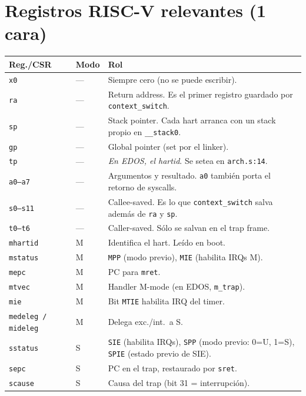 \documentclass[11pt,a4paper]{article}
\begin{document}
\section{Registros RISC-V relevantes (1 cara)}

\begin{center}
\footnotesize
\begin{tabular}{@{}llp{9.5cm}@{}}
\toprule
Reg./CSR & Modo & Rol \\
\midrule
\texttt{x0}             & --- & Siempre cero (no se puede escribir). \\
\texttt{ra}             & --- & Return address. Es el primer registro guardado por \texttt{context\_switch}. \\
\texttt{sp}             & --- & Stack pointer. Cada hart arranca con un stack propio en \texttt{\_\_stack0}. \\
\texttt{gp}             & --- & Global pointer (set por el linker). \\
\texttt{tp}             & --- & \emph{En EDOS, el hartid}. Se setea en \texttt{arch.s:14}. \\
\texttt{a0--a7}         & --- & Argumentos y resultado. \texttt{a0} también porta el retorno de syscalls. \\
\texttt{s0--s11}        & --- & Callee-saved. Es lo que \texttt{context\_switch} salva además de \texttt{ra} y \texttt{sp}. \\
\texttt{t0--t6}         & --- & Caller-saved. Sólo se salvan en el trap frame. \\
\midrule
\texttt{mhartid}        & M   & Identifica el hart. Leído en boot. \\
\texttt{mstatus}        & M   & \texttt{MPP} (modo previo), \texttt{MIE} (habilita IRQs M). \\
\texttt{mepc}           & M   & PC para \texttt{mret}. \\
\texttt{mtvec}          & M   & Handler M-mode (en EDOS, \texttt{m\_trap}). \\
\texttt{mie}            & M   & Bit \texttt{MTIE} habilita IRQ del timer. \\
\texttt{medeleg / mideleg} & M & Delega exc./int.\ a S. \\
\midrule
\texttt{sstatus}        & S   & \texttt{SIE} (habilita IRQs), \texttt{SPP} (modo previo: 0=U, 1=S), \texttt{SPIE} (estado previo de SIE). \\
\texttt{sepc}           & S   & PC en el trap, restaurado por \texttt{sret}. \\
\texttt{scause}         & S   & Causa del trap (bit 31 = interrupción). \\

\end{tabular}
\end{center}
\end{document}
